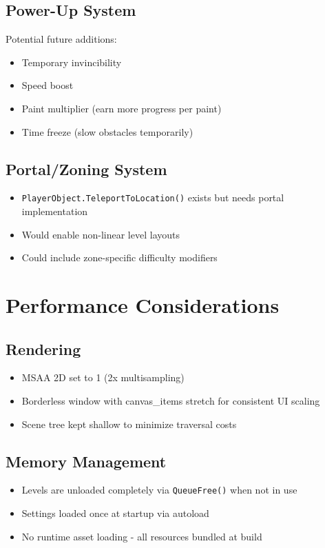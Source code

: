 \documentclass{report}
\begin{document}
\section{Power-Up System}
Potential future additions:
\begin{itemize}[noitemsep]
	\item Temporary invincibility
	\item Speed boost
	\item Paint multiplier (earn more progress per paint)
	\item Time freeze (slow obstacles temporarily)
\end{itemize}

\section{Portal/Zoning System}
\begin{itemize}[noitemsep]
	\item \texttt{PlayerObject.TeleportToLocation()} exists but needs portal implementation
	\item Would enable non-linear level layouts
	\item Could include zone-specific difficulty modifiers
\end{itemize}

\chapter{Performance Considerations}
\section{Rendering}
\begin{itemize}[noitemsep]
	\item MSAA 2D set to 1 (2x multisampling)
	\item Borderless window with canvas\_items stretch for consistent UI scaling
	\item Scene tree kept shallow to minimize traversal costs
\end{itemize}

\section{Memory Management}
\begin{itemize}[noitemsep]
	\item Levels are unloaded completely via \texttt{QueueFree()} when not in use
	\item Settings loaded once at startup via autoload
	\item No runtime asset loading - all resources bundled at build
\end{itemize}
\end{document}
